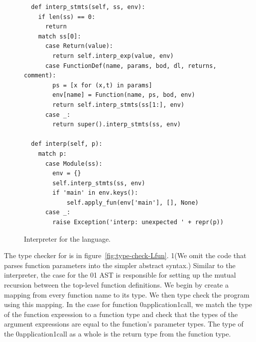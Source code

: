 \documentclass[7x10]{TimesAPriori_MIT}%
\def\racketEd{0}
\def\pythonEd{1}
\def\edition{0}
\newcommand{\racket}[1]{{\if\edition\racketEd{#1}\fi}}
\newcommand{\python}[1]{{\if\edition\pythonEd #1\fi}}
\numberwithin{theorem}{chapter}
\numberwithin{definition}{chapter}
\numberwithin{equation}{chapter}
\begin{document}
\begin{figure}[tp]
\begin{tcolorbox}[colback=white]
{\begin{lstlisting}
  def interp_stmts(self, ss, env):
    if len(ss) == 0:
      return
    match ss[0]:
      case Return(value):
        return self.interp_exp(value, env)
      case FunctionDef(name, params, bod, dl, returns, comment):
        ps = [x for (x,t) in params]
        env[name] = Function(name, ps, bod, env)
        return self.interp_stmts(ss[1:], env)
      case _:
        return super().interp_stmts(ss, env)
    
  def interp(self, p):
    match p:
      case Module(ss):
        env = {}
        self.interp_stmts(ss, env)
        if 'main' in env.keys():
            self.apply_fun(env['main'], [], None)
      case _:
        raise Exception('interp: unexpected ' + repr(p))
\end{lstlisting}
\fi}
  \end{tcolorbox}

  \caption{Interpreter for the \LangFun{} language.}
\label{fig:interp-Lfun}
\end{figure}



The type checker for \LangFun{} is in
figure~\ref{fig:type-check-Lfun}.
%
\python{(We omit the code that parses function parameters into the
  simpler abstract syntax.)}
%
Similar to the interpreter, the case for the
\racket{}\python{}
%
AST is responsible for setting up the mutual recursion between the
top-level function definitions. We begin by create a mapping
 from every function name to its type. We then type check
the program using this mapping.
%
In the case for function \racket{application}\python{call}, we match
the type of the function expression to a function type and check that
the types of the argument expressions are equal to the function's
parameter types. The type of the \racket{application}\python{call} as
a whole is the return type from the function type.
\end{document}
